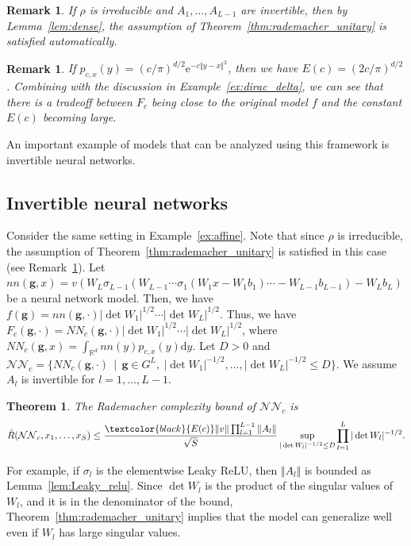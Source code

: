 \documentclass[twoside]{article}
\newtheorem{theorem}[proposition]{Theorem}
\newtheorem{remark}[proposition]{Remark}
\def\mcl#1{\mathcal{#1}}
\def\mr{\mathrm}
\def\bg{\mathbf{g}}
\def\red#1{\textcolor{black}{#1}}
\begin{document}
\begin{remark}\label{rem:irreducible_assumption}
If $\rho$ is irreducible and $A_1,\ldots,A_{L-1}$ are invertible, then by Lemma~\ref{lem:dense}, the assumption of Theorem~\ref{thm:rademacher_unitary} is satisfied automatically.
\end{remark}
\begin{remark}
If $p_{c,x}(y)=(c/\pi)^{d/2}\mr{e}^{-c\Vert y-x\Vert^2}$, then we have $E(c)=({2c}/{\pi})^{d/2}$.
Combining with the discussion in Example~\ref{ex:dirac_delta}, we can see that there is a tradeoff between $F_c$ being close to the original model $f$ and the constant $E(c)$ becoming large.
\end{remark}
\color{black}
An important example of models that can be analyzed using this framework is invertible neural networks.

\subsection{Invertible neural networks}
Consider the same setting in Example~\ref{ex:affine}.
Note that since $\rho$ is irreducible, the assumption of Theorem~\ref{thm:rademacher_unitary} is satisfied in this case (see Remark~\ref{rem:irreducible_assumption}).
Let $nn(\bg,x)=v(W_L \sigma_{L-1}(W_{L-1} \cdots \sigma_1(W_1 x - W_1 b_1) \cdots - W_{L-1} b_{L-1}) - W_L b_L)$ be a neural network model.
Then, we have $f(\bg)=nn(\bg,\cdot)\vert \det W_1\vert^{1/2}\cdots \vert\det{W_L}\vert^{1/2}$.
Thus, we have $F_c(\bg,\cdot)=NN_c(\bg,\cdot)\vert\det W_1\vert^{1/2}\cdots \vert\det{W_L}\vert^{1/2}$, where $NN_c(\bg,x)=\int_{\mathbb{R}^d}nn(y)p_{c,x}(y)\mr{d}y$.
Let $D>0$ and $\mcl{NN}_c=\{NN_c(\bg,\cdot)\,\mid\, \bg\in G^L,\ \vert\det{W_1}\vert^{-1/2},\ldots,\vert\det{W_L}\vert^{-1/2}\le D\}$.
We assume $A_l$ is invertible for $l=1,\ldots,L-1$.
\begin{theorem}\label{thm:rademacher_nn_constnat}
 The Rademacher complexity bound of $\mcl{NN}_c$ is
\begin{align*}
 \hat{R}(\mcl{NN}_c,x_1,\ldots,x_S)
\le  \frac{\red{E(c)}\Vert v\Vert\prod_{l=1}^{L-1}\Vert A_l\Vert}{\sqrt{S}} \sup_{\vert\det{W_l}\vert^{-1/2}\le D}\prod_{l=1}^L\vert\det W_l\vert^{-1/2}.
\end{align*}
\end{theorem}

For example, if $\sigma_l$ is the elementwise Leaky ReLU, then $\Vert A_l\Vert$ is bounded as Lemma~\ref{lem:Leaky_relu}.
Since $\det{W_l}$ is the product of the singular values of $W_l$, and it is in the denominator of the bound, Theorem~\ref{thm:rademacher_unitary} implies that the model can generalize well even if $W_l$
has large singular values.
\end{document}
